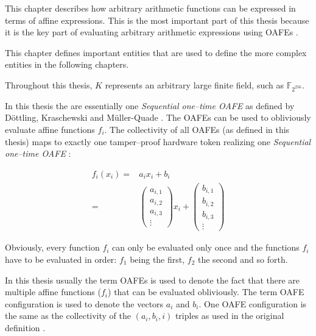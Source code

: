 \label{sec:methods}

This chapter describes how arbitrary arithmetic functions can be expressed in
terms of affine expressions. This is the most important part of this thesis
because it is the key part of evaluating arbitrary arithmetic expressions
using OAFEs \cite{davidgoliath}.


%
%
\label{sec:rae-definitions}

This chapter defines important entities that are used to define the more complex
entities in the following chapters.

\label{sec:field}

\label{def:field} Throughout this thesis, $K$ represents an arbitrary large
finite field, such as $\mathbb{F}_{2^{256}}$.




In this thesis the  are
essentially one \emph{Sequential one--time OAFE} as defined by Döttling,
Kraschewski and Müller-Quade \cite{davidgoliath}. The OAFEs can be used to
obliviously evaluate affine functions $f_i$. The collectivity of all OAFEs (as
defined in this thesis) maps to exactly one tamper--proof hardware token
realizing one \emph{Sequential one--time OAFE} \cite{davidgoliath}:

\begin{align*}
  f_i(x_i) = &
  a_ix_i + b_i \\
%
  = &
\begin{pmatrix}a_{i,1}\\a_{i,2}\\a_{i,3}\\\vdots\end{pmatrix}x_i +
\begin{pmatrix}b_{i,1}\\b_{i,2}\\b_{i,3}\\\vdots\end{pmatrix}
\end{align*}

\noindent{}Obviously, every function $f_i$ can only be evaluated only once and
the functions $f_i$ have to be evaluated in order: $f_1$ being the first, $f_2$
the second and so forth.

In this thesis usually the term OAFEs is used to denote the fact that there are
multiple affine functions ($f_i$) that can be evaluated obliviously. The term
OAFE configuration is used to denote the vectors $a_i$ and $b_i$. One OAFE
configuration is the same as the collectivity of the $(a_i, b_i, i)$ triples as
used in the original definition \cite{davidgoliath}.


